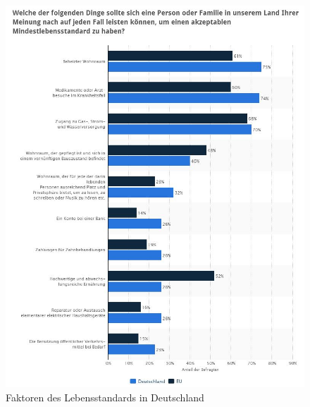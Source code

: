 \begin{figure} [hp]
\centering
\includegraphics[width=0.7\linewidth]{./images/FaktorenLebensstand}
\caption{Faktoren des Lebensstandards in Deutschland \cite{statistaDeLebnst}}
\label{fig:FaktorenLebensstand}
\end{figure}
